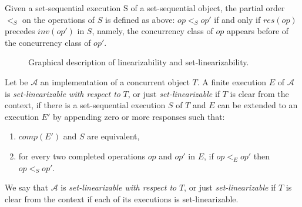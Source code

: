 Given a set-sequential execution S of a set-sequential object, the partial order \(<_S\) on the operations of \(S\) is defined as above: \(op <_S op'\) if and only if \(res(op)\) precedes \(inv(op')\) in \(S\), namely, the concurrency class of \(op\) appears before of the concurrency class of \(op'\).

\begin{figure}[!ht]
  \centering
  \hfill
  \caption{\label{fig-example-linear-and-set-linear}Graphical
    description of linearizability and set-linearizability.
}
\end{figure}


\begin{definition}
    Let be \(\mathcal{A}\) an implementation of a concurrent object \(T\). A finite execution \(E\) of \(\mathcal{A}\) is \emph{set-linearizable with respect to} \(T\), or just \emph{set-linearizable} if \(T\) is clear from the context, if there is a set-sequential execution \(S\) of \(T\) and \(E\) can be extended to an execution \(E'\) by appending zero or more responses such that:

    \begin{enumerate}
        \item \(comp(E')\) and \(S\) are equivalent,
        \item for every two completed operations \(op\) and \(op'\) in \(E\), if \(op <_E op'\) then \(op <_S op'\).
    \end{enumerate}

    We say that \(\mathcal{A}\) is \emph{set-linearizable with respect to} \(T\), or just \emph{set-linearizable} if \(T\) is clear from the context if each of its executions is set-linearizable.
  \end{definition}

